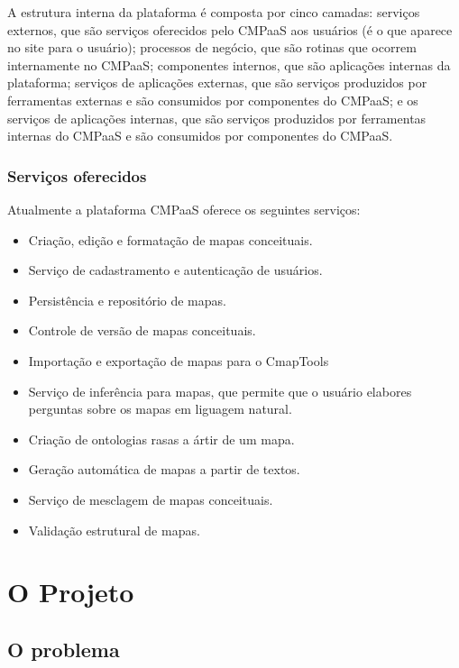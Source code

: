 \documentclass[
	12pt,				%
	openright,			%
	oneside,			%
	a4paper,			%
	english,			%
	french,				%
	spanish,			%
	brazil				%
	]{abntex2}
\begin{document}
A estrutura interna da plataforma é composta por cinco camadas: serviços externos, que são serviços oferecidos pelo CMPaaS aos usuários (é o que aparece no site para o usuário); processos de negócio, que são rotinas que ocorrem internamente no CMPaaS; componentes internos, que são aplicações internas da plataforma; serviços de aplicações externas, que são serviços produzidos por ferramentas externas e são consumidos por componentes do CMPaaS; e os serviços de aplicações internas, que são serviços produzidos por ferramentas internas do CMPaaS e são consumidos por componentes do CMPaaS.

\subsection{Serviços oferecidos}

Atualmente a plataforma CMPaaS oferece os seguintes serviços:

\begin{itemize}
	\item Criação, edição e formatação de mapas conceituais.
	\item Serviço de cadastramento e autenticação de usuários.
	\item Persistência e repositório de mapas.
	\item Controle de versão de mapas conceituais.
	\item Importação e exportação de mapas para o CmapTools
	\item Serviço de inferência para mapas, que permite que o usuário elabores perguntas sobre os mapas em liguagem natural.
	\item Criação de ontologias rasas a ártir de um mapa.
	\item Geração automática de mapas a partir de textos.
	\item Serviço de mesclagem de mapas conceituais.
	\item Validação estrutural de mapas.
\end{itemize} 

 

\chapter{O Projeto}\label{cap-projeto}

\section{O problema}
\end{document}
